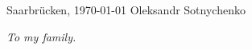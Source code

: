 \documentclass[11pt, a4paper, twoside]{Thesis}
\newcommand{\listofalgorithmes}{\tocfile{\listalgorithmcfname}{loa}}
\begin{document}
\begin{flushright}
\noindent Saarbr\"{u}cken, \today
\hfill
Oleksandr Sotnychenko
\end{flushright}

\clearpage  %

\newpage
\mbox{}
\thispagestyle{empty}
\newpage

\clearpage
\newpage
\mbox{}
\thispagestyle{empty}
\newpage


\clearpage  %
\newpage
\mbox{}
\thispagestyle{empty}
\newpage

\thispagestyle{empty}
\emph{To my family.}
\clearpage

\newpage
\mbox{}
\thispagestyle{empty}
\newpage

\begin{spacing}{0.1}
\pagestyle{fancy}
\tableofcontents
\newpage
\listoffigures
\newpage
\end{spacing}

\clearpage

\mainmatter


\clearpage


\clearpage


\clearpage


\clearpage


\clearpage



{\small}
\clearpage



%
\end{document}
